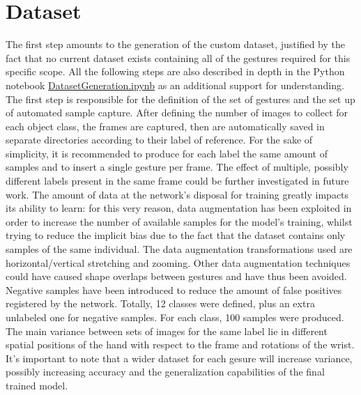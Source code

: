 \documentclass[10pt,twocolumn,letterpaper]{article}
\begin{document}
\section{Dataset}
\begin{flushleft}
The first step amounts to the generation of the custom dataset, justified by the fact that no current dataset exists containing all of the gestures required for this specific scope.
All the following steps are also described in depth in the Python notebook \href{https://github.com/MarzioVallero/ML-Based-Blender-Gestural-Input-Interface/blob/master/DatasetGeneration.ipynb}{DatasetGeneration.ipynb} as an additional support for understanding.\linebreak
The first step is responsible for the definition of the set of gestures and the set up of automated sample capture. After defining the number of images to collect for each object class, the frames are captured, then are automatically saved in separate directories according to their label of reference. For the sake of simplicity, it is recommended to produce for each label the same amount of samples and to insert a single gesture per frame. The effect of multiple, possibly different labels present in the same frame could be further investigated in future work.\linebreak
The amount of data at the network's disposal for training greatly impacts its ability to learn: for this very reason, data augmentation has been exploited in order to increase the number of available samples for the model's training, whilst trying to reduce the implicit bias due to the fact that the dataset contains only samples of the same individual. The data augmentation transformations used are horizontal/vertical stretching and zooming. Other data augmentation techniques could have caused shape overlaps between gestures and have thus been avoided. Negative samples have been introduced to reduce the amount of false positives registered by the network.\linebreak
Totally, 12 classes were defined, plus an extra unlabeled one for negative samples. For each class, 100 samples were produced.\linebreak
The main variance between sets of images for the same label lie in different spatial positions of the hand with respect to the frame and rotations of the wrist.\linebreak
It's important to note that a wider dataset for each gesure will increase variance, possibly increasing accuracy and the generalization capabilities of the final trained model.


\end{flushleft}
\end{document}
